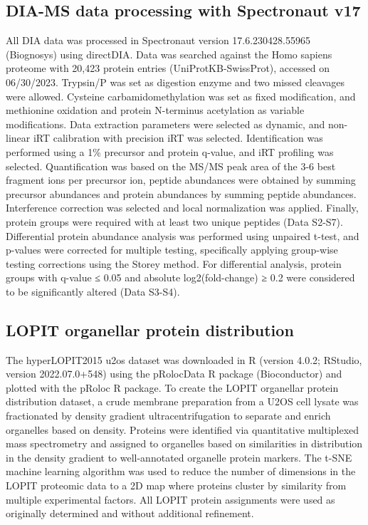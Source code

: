 \begin{refsection}
    \subsection{DIA-MS data processing with Spectronaut v17}
    All DIA data was processed in Spectronaut version 17.6.230428.55965 (Biognosys) using directDIA. Data was searched against the Homo sapiens proteome with 20,423 protein entries (UniProtKB-SwissProt), accessed on 06/30/2023. Trypsin/P was set as digestion enzyme and two missed cleavages were allowed. Cysteine carbamidomethylation was set as fixed modification, and methionine oxidation and protein N-terminus acetylation as variable modifications. Data extraction parameters were selected as dynamic, and non-linear iRT calibration with precision iRT was selected. Identification was performed using a 1\% precursor and protein q-value, and iRT profiling was selected. Quantification was based on the MS/MS peak area of the 3-6 best fragment ions per precursor ion, peptide abundances were obtained by summing precursor abundances and protein abundances by summing peptide abundances. Interference correction was selected and local normalization was applied. Finally, protein groups were required with at least two unique peptides (Data S2-S7). Differential protein abundance analysis was performed using unpaired t-test, and p-values were corrected for multiple testing, specifically applying group-wise testing corrections using the Storey method\cite{storey2002a,burger2018a}. For differential analysis, protein groups with q-value ≤ 0.05 and absolute log2(fold-change) ≥ 0.2 were considered to be significantly altered (Data S3-S4).
    
    \subsection{LOPIT organellar protein distribution}
    The hyperLOPIT2015 u2os dataset was downloaded in R (version 4.0.2; RStudio, version 2022.07.0+548) using the pRolocData R package (Bioconductor) and plotted with the pRoloc R package\cite{mulvey2017a}. To create the LOPIT organellar protein distribution dataset, a crude membrane preparation from a U2OS cell lysate was fractionated by density gradient ultracentrifugation to separate and enrich organelles based on density\cite{thul1979a,dunkley2004a,mulvey2017a}. Proteins were identified via quantitative multiplexed mass spectrometry and assigned to organelles based on similarities in distribution in the density gradient to well-annotated organelle protein markers. The t-SNE machine learning algorithm was used to reduce the number of dimensions in the LOPIT proteomic data to a 2D map where proteins cluster by similarity from multiple experimental factors\cite{meier2020a}. All LOPIT protein assignments were used as originally determined and without additional refinement.
    

\end{refsection}

